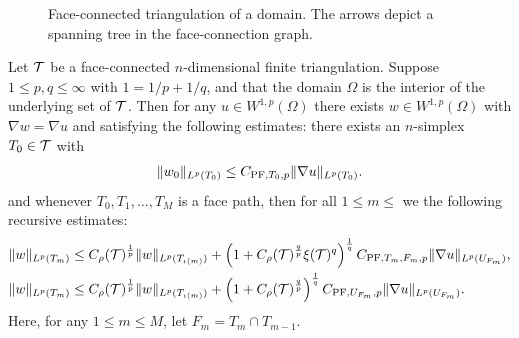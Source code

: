 \documentclass[10pt,a4paper]{article}
\begin{document}
\begin{figure}[t]
\begin{center}
\begin{tikzpicture}[rotate=-60]
\end{tikzpicture}
\end{center}
\caption{Face-connected triangulation of a domain. The arrows depict a spanning tree in the face-connection graph.}
\label{figure:spanningtree}
\end{figure}


\begin{theorem}\label{theorem:poincarefriedrichsestimate:grad}
    Let $\calT$ be a face-connected $n$-dimensional finite triangulation. 
    Suppose $1 \leq p,q \leq \infty$ with $1 = 1/p + 1/q$,
    and that the domain $\Omega$ is the interior of the underlying set of $\calT$. 
    Then for any $u \in W^{1,p}(\Omega)$ 
    there exists $w \in W^{1,p}(\Omega)$ with $\nabla w = \nabla u$ 
    and satisfying the following estimates:
    there exists an $n$-simplex $T_0 \in \calT$ with 
    \begin{gather*}
        \| w_0 \|_{L^{p}(T_{0})} \leq C_{{\PF},T_{0},p} \| \nabla u \|_{L^{p}(T_{0})}.
    \end{gather*}
    and whenever $T_0, T_1, \dots, T_M$ is a face path,
    then for all $1 \leq m \leq$ we the following recursive estimates:
    \begin{align*}
        \| w \|_{L^{p}(T_{m})}
        &
        \leq  
        \volumeratio(\calT)^{\frac 1 p} 
        \| w \|_{L^{p}(T_{\iota(m)})} 
        + 
        \left( 1 + \volumeratio(\calT)^{\frac q p} \xi(\calT)^{q} \right)^{\frac 1 q}
        C_{\PF,T_{m},F_{m},p} 
        \| \nabla u \|_{L^{p}(U_{F_m})} 
        ,
        \\
        \| w \|_{L^{p}(T_m)}
        &\leq 
        \volumeratio(\calT)^{\frac 1 p} 
        \| w \|_{L^{p}(T_{{\iota(m)}})}
        +
        \left( 1 + \volumeratio(\calT)^{\frac q p} \right)^{\frac 1 q}
        C_{{\PF},U_{F_m},p} 
        \| \nabla u \|_{L^{p}(U_{F_m})} 
        . 
    \end{align*}
    Here, for any $1 \leq m \leq M$, let $F_m = T_m \cap T_{m-1}$.
\end{theorem}
\end{document}
